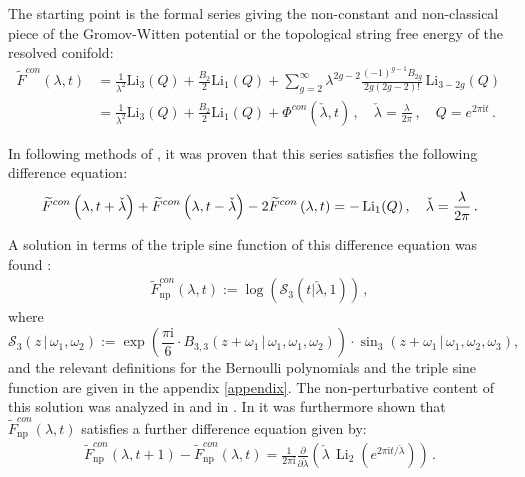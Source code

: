 \documentclass[a4paper,12pt,justification=centering]{article}
\numberwithin{equation}{section}
\newcommand{\I}{{\mathrm i}}
\theoremstyle{plain}%
\theoremstyle{definition}
\begin{document}
The starting point is the formal series giving the non-constant and non-classical piece of the Gromov-Witten potential or the topological string free energy of the resolved conifold:
\begin{align*}\label{formal}
\widetilde{F}^{con}(\lambda,t)&=  \frac{1}{\lambda^2} \mathrm{Li}_{3}(Q)+\frac{B_2}{2}\mathrm{Li}_1(Q) + \sum_{g=2}^{\infty} \lambda^{2g-2} \frac{(-1)^{g-1}B_{2g}}{2g (2g-2)!}\, \mathrm{Li}_{3-2g} (Q) \,  \\
&=\frac{1}{\lambda^2} \mathrm{Li}_{3}(Q)  +\frac{B_2}{2}\mathrm{Li}_1(Q)+ \Phi^{con}(\check{\lambda},t)\,, \quad \check{\lambda}=\frac{\lambda}{2\pi}\,, \quad Q=e^{2\pi \I t}\,. 
\end{align*} 

In \cite{Alim:2020tpw} following methods of \cite{Iwaki2}, it was proven that this series satisfies the following difference equation:
\begin{equation}\label{eq:diffeq}
\widetilde{F}^{con}\left(\lambda,t+\check{\lambda}\right) + \widetilde{F}^{con}\left(\lambda,t-\check{\lambda}\right) - 2 \widetilde{F}^{con}\left(\lambda,t\right)=-\operatorname{Li}_1(Q) \,, \quad \check{\lambda}=\frac{\lambda}{2\pi}\,.\\
\end{equation}

A solution in terms of the triple sine function of this difference equation was found \cite{Alim:2021lld}:
\begin{equation}
\begin{split}
\widetilde{F}^{con}_{\text{np}}(\lambda,t) := \log \left( \mathcal{S}_3(t | \check{\lambda},1)\right)\,,
\end{split}
\end{equation}
where 
$$ 
    \mathcal{S}_3(z\, | \, \omega_1,\omega_2) := \exp\left(\frac{\pi \I}{6} \cdot B_{3,3}(z+\omega_1\,|\,\omega_1,\omega_1,\omega_2)\right) \cdot \sin_3(z+\omega_1\, |\, \omega_1,\omega_2,\omega_3),$$
and the relevant definitions for the Bernoulli polynomials and the triple sine function are given in the appendix \ref{appendix}. The non-perturbative content of this solution was analyzed in \cite{Alim:2021ukq} and in \cite{Alim:2021mhp}. In \cite{Alim:2022oll} it was furthermore shown that $\widetilde{F}^{con}_{\text{np}}(\lambda,t)$ satisfies a further difference equation given by:
\begin{align}\label{eq:diffeq2}
    \widetilde{F}_{\text{np}}^{con}(\lambda,t+1)-\widetilde{F}_{\text{np}}^{con}(\lambda,t)=\frac{1}{2\pi \I} \frac{\partial}{\partial \check{\lambda}} \left(  \check{\lambda} \, \operatorname{Li}_2(e^{2\pi \I t/\check{\lambda}})\right)\,.
\end{align}
\end{document}
